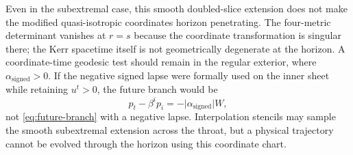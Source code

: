 \documentclass[11pt]{article}
\begin{document}
Even in the subextremal case, this smooth doubled-slice extension does not
make the modified quasi-isotropic coordinates horizon penetrating.  The
four-metric determinant vanishes at \(r=s\) because the coordinate
transformation is singular there; the Kerr spacetime itself is not
geometrically degenerate at the horizon.  A coordinate-time geodesic test
should remain in the regular exterior, where
\(\alpha_{\mathrm{signed}}>0\).  If the negative signed lapse were formally
used on the inner sheet while retaining \(u^t>0\), the future branch would be
\begin{equation}
 p_t-\beta^i p_i=-\lvert\alpha_{\mathrm{signed}}\rvert W,
 \label{eq:signed-lapse-branch}
\end{equation}
not \cref{eq:future-branch} with a negative lapse.  Interpolation stencils may
sample the smooth subextremal extension across the throat, but a physical
trajectory cannot be evolved through the horizon using this coordinate chart.
\end{document}
